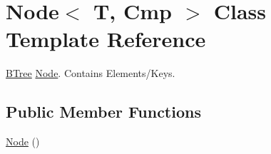 \hypertarget{classNode}{
\section{Node$<$ T, Cmp $>$ Class Template Reference}
\label{classNode}
}


\hyperlink{classBTree}{BTree} \hyperlink{classNode}{Node}. Contains Elements/Keys.  


\subsection*{Public Member Functions}
\begin{DoxyCompactItemize}
\item 
\hypertarget{classNode_ae2154f7c64506d0d7656aaa7bb728403}{
\hyperlink{classNode_ae2154f7c64506d0d7656aaa7bb728403}{Node} ()}
\label{classNode_ae2154f7c64506d0d7656aaa7bb728403}


\end{DoxyCompactItemize}
